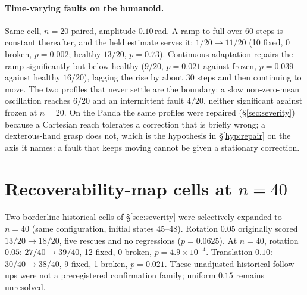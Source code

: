 \documentclass{article}
\begin{document}
\paragraph{Time-varying faults on the humanoid.} Same cell, $n=20$ paired, amplitude
$0.10$\,rad. A ramp to full over 60 steps is constant thereafter, and the held estimate
serves it: $1/20\to11/20$ (10 fixed, 0 broken, $p=0.002$; healthy $13/20$, $p=0.73$).
Continuous adaptation repairs the ramp significantly but below healthy ($9/20$, $p=0.021$
against frozen, $p=0.039$ against healthy $16/20$), lagging the rise by about 30 steps and
then continuing to move. The two profiles that never settle are the boundary: a slow
non-zero-mean oscillation reaches $6/20$ and an intermittent fault $4/20$, neither
significant against frozen at $n=20$. On the Panda the same profiles were repaired
(\S\ref{sec:severity}) because a Cartesian reach tolerates a correction that is briefly
wrong; a dexterous-hand grasp does not, which is the hypothesis in \S\ref{hyp:repair} on the
axis it names: a fault that keeps moving cannot be given a stationary correction.

\section{Recoverability-map cells at \texorpdfstring{$n=40$}{n=40}}
\label{app:map40}
Two borderline historical cells of \S\ref{sec:severity} were selectively expanded to
$n=40$ (same configuration, initial states 45--48). Rotation $0.05$ originally scored
$13/20\to18/20$, five rescues and no regressions ($p=0.0625$). At $n=40$, rotation
$0.05$: $27/40\to39/40$, 12 fixed, 0 broken, $p=4.9\times10^{-4}$. Translation $0.10$:
$30/40\to38/40$, 9 fixed, 1 broken, $p=0.021$. These unadjusted historical follow-ups
were not a preregistered confirmation family; uniform $0.15$ remains unresolved.
\end{document}
